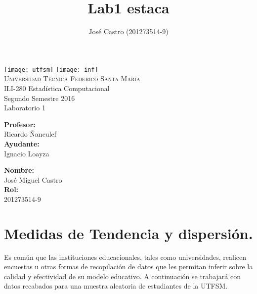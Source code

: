 \documentclass[12pt,letterpaper,hidelinks]{article}
\author{José Castro (201273514-9)}
\title{Lab1 estaca}
\begin{document}
\begin{titlepage}
 
\begin{center}
\texttt{[image: utfsm]}\hspace{.5\textwidth}
\texttt{[image: inf]}
\\[1cm]
{\Large \textsc{Universidad Técnica Federico Santa María} }\\[.5cm]
{\Large {ILI-280 Estadística Computacional} }\\[.5cm]
{\Large {Segundo Semestre 2016} }\\[1.5cm]
{\Huge {Laboratorio 1}}\\[10cm]

\begin{minipage}[l]{0.4\textwidth}
	\begin{flushleft}
		\textbf{\textsf{Profesor:}}\\
		{\large Ricardo Ñanculef}\\ 
		\textbf{\textsf{Ayudante:}}\\
		{\large Ignacio Loayza}\\ 
		\end{flushleft}
\end{minipage}
\begin{minipage}[l]{0.4\textwidth}
	\begin{flushright}
		\textbf{\textsf{Nombre:}}\\
		\large José Miguel Castro\\
		\textbf{\textsf{Rol:}}\\
		\large 201273514-9
	\end{flushright}
\end{minipage} 
\end{center}
 
\end{titlepage}

\section{Medidas de Tendencia y dispersión.}

Es común que las instituciones educacionales, tales como universidades, realicen encuestas u otras formas de recopilación de datos que les permitan inferir sobre la calidad y efectividad de su modelo educativo. A continuación se trabajará con datos recabados para una muestra aleatoria de estudiantes de la UTFSM.
\end{document}

